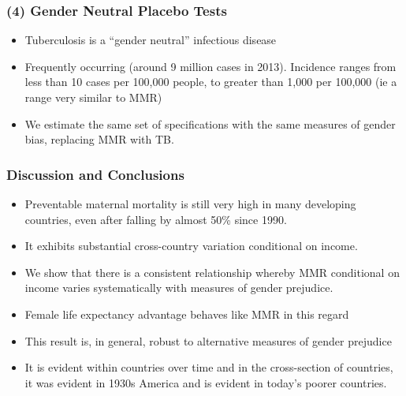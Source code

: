 \documentclass[10pt,letterpaper,subeqn]{beamer}
\begin{document}
\begin{frame}

\end{frame}





\begin{frame}
\frametitle{(4) Gender Neutral Placebo Tests}
\begin{itemize}
\setlength{\itemsep}{10pt}
  \item Tuberculosis is a ``gender neutral'' infectious disease
  \item Frequently occurring (around 9 million cases in 2013). Incidence ranges
        from less than 10 cases per 100,000 people, to greater than 1,000 per
        100,000 (ie a range very similar to MMR)
  \item We estimate the same set of specifications with the same measures of
        gender bias, replacing MMR with TB.
\end{itemize}
\end{frame}

\begin{frame}

\end{frame}

\begin{frame}

\end{frame}

\begin{frame}[plain]

\end{frame}

\begin{frame}
\frametitle{Discussion and Conclusions}
\begin{itemize}
	\item Preventable maternal mortality is still very high in many developing 
        countries, even after falling by almost 50\% since 1990.
	\item It exhibits substantial cross-country variation conditional on income.
	\item We show that there is a consistent relationship whereby MMR conditional 
        on income varies systematically with measures of gender prejudice.
	\item Female life expectancy advantage behaves like MMR in this regard
	\item This result is, in general, robust to alternative measures of gender 
        prejudice
	\item It is evident within countries over time and in the cross-section of
        countries, it was evident in 1930s America and is evident in today's
        poorer countries.
\end{itemize}
\end{frame}
\end{document}
